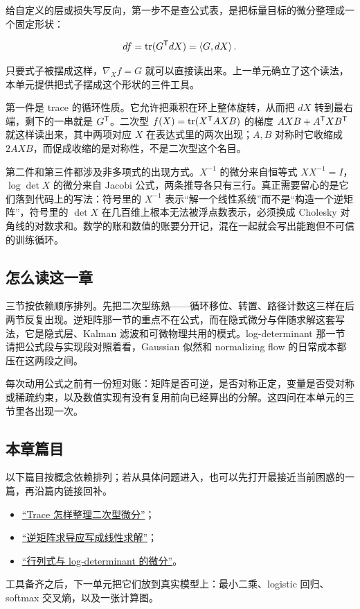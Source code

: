 给自定义的层或损失写反向，第一步不是查公式表，是把标量目标的微分整理成一个固定形状：

\[
df=\operatorname{tr}(G^{\mathsf{T}}dX)=\left\langle G,dX\right\rangle.
\]

只要式子被摆成这样，\(\nabla_Xf=G\) 就可以直接读出来。上一单元确立了这个读法，本单元提供把式子摆成这个形状的三件工具。

第一件是 trace 的循环性质。它允许把乘积在环上整体旋转，从而把 \(dX\) 转到最右端，剩下的一串就是 \(G^{\mathsf{T}}\)。二次型 \(f(X)=\operatorname{tr}(X^{\mathsf{T}}AXB)\) 的梯度 \(AXB+A^{\mathsf{T}}XB^{\mathsf{T}}\) 就这样读出来，其中两项对应 \(X\) 在表达式里的两次出现；\(A,B\) 对称时它收缩成 \(2AXB\)，而促成收缩的是对称性，不是二次型这个名目。

第二件和第三件都涉及非多项式的出现方式。\(X^{-1}\) 的微分来自恒等式 \(XX^{-1}=I\)，\(\log\det X\) 的微分来自 Jacobi 公式，两条推导各只有三行。真正需要留心的是它们落到代码上的写法：符号里的 \(X^{-1}\) 表示``解一个线性系统''而不是``构造一个逆矩阵''，符号里的 \(\det X\) 在几百维上根本无法被浮点数表示，必须换成 Cholesky 对角线的对数求和。数学的账和数值的账要分开记，混在一起就会写出能跑但不可信的训练循环。

\subsection{怎么读这一章}

三节按依赖顺序排列。先把二次型练熟——循环移位、转置、路径计数这三样在后两节反复出现。逆矩阵那一节的重点不在公式，而在隐式微分与伴随求解这套写法，它是隐式层、Kalman 滤波和可微物理共用的模式。log-determinant 那一节请把公式段与实现段对照着看，Gaussian 似然和 normalizing flow 的日常成本都压在这两段之间。

每次动用公式之前有一份短对账：矩阵是否可逆，是否对称正定，变量是否受对称或稀疏约束，以及数值实现有没有复用前向已经算出的分解。这四问在本单元的三节里各出现一次。

\subsection{本章篇目}

以下篇目按概念依赖排列；若从具体问题进入，也可以先打开最接近当前困惑的一篇，再沿篇内链接回补。

\begin{itemize}
\tightlist
\item \hyperref[sec:10-Matrix-Calculus/03-Trace-Calculus/01]{``Trace 怎样整理二次型微分''}；
\item \hyperref[sec:10-Matrix-Calculus/03-Trace-Calculus/02]{``逆矩阵求导应写成线性求解''}；
\item \hyperref[sec:10-Matrix-Calculus/03-Trace-Calculus/03]{``行列式与 log-determinant 的微分''}。
\end{itemize}

工具备齐之后，下一单元把它们放到真实模型上：最小二乘、logistic 回归、softmax 交叉熵，以及一张计算图。
